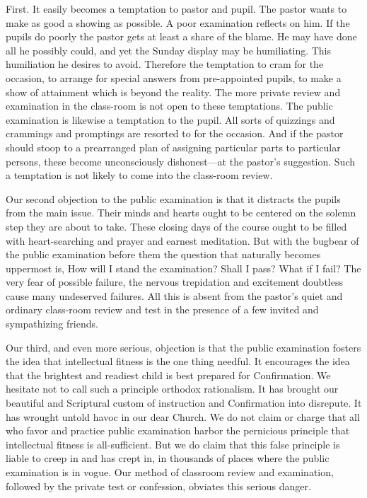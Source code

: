 First. It easily becomes a temptation to pastor and pupil.  The pastor wants to make as good a showing as possible. A poor examination reflects on him. If the pupils do poorly the pastor gets at least a share of the blame. He may have done all he possibly could, and yet the Sunday display may be humiliating. This humiliation he desires to avoid. Therefore the temptation to cram for the occasion, to arrange for special answers from pre-appointed pupils, to make a show of attainment which is beyond the reality. The more private review and examination in the class-room is not open to these temptations. The public examination is likewise a temptation to the pupil. All sorts of quizzings and crammings and promptings are resorted to for the occasion. And if the pastor should stoop to a prearranged plan of assigning particular parts to particular persons, these become unconsciously dishonest—at the pastor’s suggestion. Such a temptation is not likely to come into the class-room review. 

Our second objection to the public examination is
that it distracts the pupils from the main issue.  Their minds and hearts ought to be centered on the solemn step they are about to take. These closing days of the course ought to be filled with heart-searching and prayer and earnest meditation. But with the bugbear of the public examination before them the question that naturally becomes uppermost is, How will I stand the examination? Shall I pass? What if I fail? The very fear of possible failure, the nervous trepidation and excitement doubtless cause many undeserved failures. All this is absent from the pastor’s quiet and ordinary class-room review and test in the presence of a few invited and sympathizing friends. 

Our third, and even more serious, objection is that the public examination fosters the idea that  intellectual fitness is the one thing needful. It encourages the idea that the brightest and readiest child is best prepared for Confirmation. We hesitate not to call such a principle orthodox rationalism. It has brought our beautiful and Scriptural custom of instruction and Confirmation into disrepute. It has wrought untold havoc in our dear Church. We do not claim or charge that all who favor and practice public examination harbor the pernicious principle that intellectual fitness is all-sufficient. But we do claim that this false principle is liable to creep in and has crept in, in thousands of places where the public
examination is in vogue. Our method of classroom review and examination, followed by the private test or confession, obviates this serious danger. 

